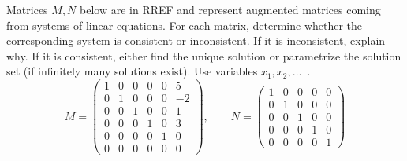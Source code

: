 \documentclass[12pt,letterpaper]{exam}
\begin{document}
\begin{questions}
\newpage
\question[15] Matrices $M, N$ below are in RREF and represent augmented matrices coming from systems of linear equations. For each matrix, determine whether the corresponding system is consistent or inconsistent. If it is inconsistent, explain why. If it is consistent, either find the unique solution or parametrize the solution set (if infinitely many solutions exist). Use variables $x_1, x_2, \ldots$\ . 
	\[
	M= \begin{pmatrix} 1 & 0 & 0 & 0 & 0 & 5 \\ 0 & 1 & 0 & 0 & 0 & -2 \\ 0 & 0 & 1 & 0 & 0 & 1 \\ 0 & 0 & 0 & 1 & 0 & 3 \\ 0 & 0 & 0 & 0 & 1 & 0 \\ 0 & 0 & 0 & 0 & 0 & 0 \end{pmatrix}, \qquad
	N= 
	\begin{pmatrix}
	1 & 0 & 0 & 0 & 0 \\
	0 & 1 & 0 & 0 & 0 \\
	0 & 0 & 1 & 0 & 0 \\
	0 & 0 & 0 & 1 & 0 \\
	0 & 0 & 0 & 0 & 1
	\end{pmatrix}
	\] \par\vspace{0.2cm}




\end{questions}
\end{document}
